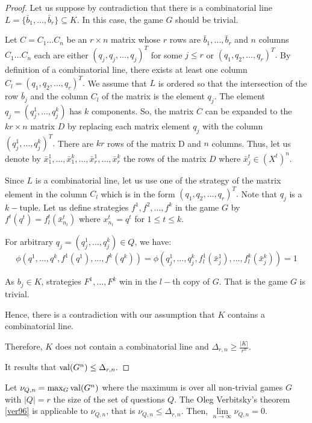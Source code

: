 \begin{proof}
Let us suppose by contradiction that there is a combinatorial line $L=\{\bar{b}_1, \ldots, \bar{b}_r \} \subseteq K.$ In this case,  the game  $G$ should be trivial.
 
Let $C=C_1\ldots C_n$ be an $r \times n$ matrix whose $r$ rows are $\bar{b}_1, \ldots, \bar{b}_r$ and $n$ columns $C_1\ldots C_n$ each are either $(q_j,q_j,\ldots,q_j)^T$ for some $j\leq r$ or $(q_1,q_2,\ldots,q_r)^T.$ By definition of a combinatorial line, there exists at least one column $C_l=(q_1,q_2,\ldots,q_r)^T.$ We assume that $L$ is ordered so that the intersection of the row $\bar{b}_j$ and the column $C_l$ of the matrix is the element $q_j.$ The element $q_j=(q_j^1,\ldots, q_j^k)$ has $k$ components. So, the  matrix $C$ can be expanded to the $kr \times n$ matrix $D$ by replacing each matrix element $q_j$ with the column $(q_j^1,\ldots, q_j^k)^T.$ There are $kr$ rows of the matrix D and $n$ columns. Thus, let us denote by $\bar{x}_1^1, \ldots, \bar{x}_1^k, \ldots, \bar{x}_r^1, \ldots, \bar{x}_r^k$ the rows of the matrix $D$ where $\bar{x}_j^t \in  (X^t)^n.$

Since $L$ is a combinatorial line, let us use one of the strategy of the matrix element in the column $C_l$ which is in the form $(q_1,q_2,\ldots,q_r)^T.$  Note that $q_j$ is a $k-$tuple. 
Let us define strategies $f^1,f^2, \ldots, f^k$ in the game $G$ by $f^t(q^t)=f_l^t(\bar{x}_{n_t}^t)$ where $x_{n_t}^t=q^t$ for $1\leq t \leq k.$ 

For  arbitrary $q_j= (q_j^1,\ldots, q_j^k) \in Q$, we have:
$$\phi (q^1,\ldots, q^k, f^1(q^1), \ldots, f^k(q^k))= \phi (q_j^1,\ldots, q_j^k, f_l^1(\bar{x}_j^1), \ldots, f_l^k(\bar{x}_j^k))=1$$

As $b_j \in K$,
strategies $F^1, \ldots, F^k$ win in  the $l-$th copy of $G$. That is the game $G$ is  trivial. 

Hence, there is a contradiction with our assumption that $K$ contains a combinatorial line.

Therefore, $K$ does not contain a combinatorial line and $\Delta_{r,n} \geq  \frac{|K|}{r^n}$.

It results
that $\mathrm{val} (G^n) \leq \Delta_{r,n}.$
\end{proof}

Let $\nu_{Q,n}=\max_G \mathrm{val} (G^n)$ where the maximum is over all non-trivial games $G$ with $|Q|=r$ the size of the set of questions $Q.$ 
The Oleg Verbitsky's theorem \eqref{ver96} is applicable to $\nu_{Q,n}$, that is $\nu_{Q,n} \leq \Delta_{r,n}.$
Then, $\lim\limits_{n\longrightarrow \infty} \nu_{Q,n}=0.$

